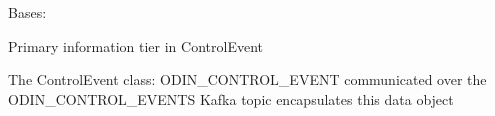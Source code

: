 \documentclass[letterpaper,10pt,english]{sphinxmanual}
\begin{document}

\begin{fulllineitems}
\label{\detokenize{Raven:Raven.ControlEvent}}
\sphinxAtStartPar
Bases: 

\sphinxAtStartPar
Primary information tier in ControlEvent

\sphinxAtStartPar
The ControlEvent class: ODIN\_CONTROL\_EVENT communicated over the ODIN\_CONTROL\_EVENTS Kafka topic encapsulates this
data object

\end{fulllineitems}

\end{document}
